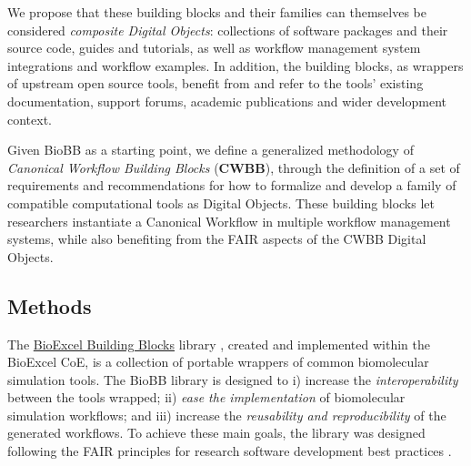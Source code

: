 We propose that these building blocks and their families can themselves
be considered \emph{composite Digital Objects}: collections of software
packages and their source code, guides and tutorials, as well as
workflow management system integrations and workflow examples. In
addition, the building blocks, as wrappers of upstream open source
tools, benefit from and refer to the tools' existing documentation,
support forums, academic publications and wider development context.

Given BioBB as a starting point, we define a generalized methodology of
\emph{Canonical Workflow Building Blocks} (\textbf{CWBB}), through the
definition of a set of requirements and recommendations for how to
formalize and develop a family of compatible computational tools as
Digital Objects. These building blocks let researchers instantiate a
Canonical Workflow in multiple workflow management systems, while also
benefiting from the FAIR aspects of the CWBB Digital Objects.

\subsection{Methods}\label{methods}

The \href{http://mmb.irbbarcelona.org/biobb/}{BioExcel Building Blocks}
library \cite{ch6-10}, created and implemented within the BioExcel CoE, is a
collection of portable wrappers of common biomolecular simulation tools.
The BioBB library is designed to i) increase the \emph{interoperability}
between the tools wrapped; ii) \emph{ease the implementation} of
biomolecular simulation workflows; and iii) increase the
\emph{reusability and reproducibility} of the generated workflows. To
achieve these main goals, the library was designed following the FAIR
principles for research software development best practices \cite{Lamprecht 2019}.


